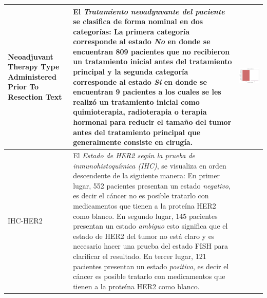 \begin{table}[!htb]
\begin{threeparttable}
\begin{tabular}{p{2.5cm} p{7cm} p{6.5cm}}
			\\ \hline
			Neoadjuvant Therapy Type Administered Prior To Resection Text
			& El \textit{Tratamiento neoadyuvante del paciente} se clasifica de forma nominal en dos categorías: La primera categoría corresponde al estado \textit{No} en donde se encuentran 809 pacientes que no recibieron un tratamiento inicial antes del tratamiento principal y la segunda categoría corresponde al estado \textit{Si} en donde se encuentran 9 pacientes a los cuales se les realizó un tratamiento inicial como quimioterapia, radioterapia o terapia hormonal para reducir el tamaño del tumor antes del tratamiento principal que generalmente consiste en cirugía.
			& \begin{center}\includegraphics[width=1\linewidth]{NOTEBOOK/IMAGENES_DESCRIPTIVAS/19_neoadjuvant_therapy}\end{center}
			\\ \hline
			
			IHC-HER2
			& El \textit{Estado de HER2 según la prueba de inmunohistoquímica (IHC)}, se visualiza en orden descendente de la siguiente manera: En primer lugar, 552 pacientes presentan un estado \textit{negativo}, es decir el cáncer no es posible tratarlo con medicamentos que tienen a la proteína HER2 como blanco. En segundo lugar, 145 pacientes presentan un estado \textit{ambiguo} esto significa que el estado de HER2 del tumor no está claro y es necesario hacer una prueba del estado FISH para clarificar el resultado. En tercer lugar, 121 pacientes presentan un estado \textit{positivo}, es decir el cáncer es posible tratarlo con medicamentos que tienen a la proteína HER2 como blanco.
			

\end{tabular}
\end{threeparttable}
\end{table}

